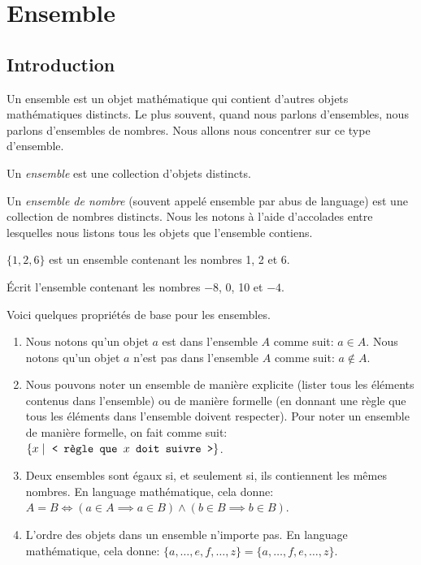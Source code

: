 \chapter{Ensemble}

\section{Introduction}

Un ensemble est un objet mathématique qui contient d'autres objets mathématiques distincts. Le plus souvent, quand nous parlons d'ensembles, nous parlons d'ensembles de nombres. Nous allons nous concentrer sur ce type d'ensemble.

\begin{definition}
    Un \emph{ensemble} est une collection d'objets distincts.
\end{definition}

\begin{definition}
    Un \emph{ensemble de nombre} (souvent appelé ensemble par abus de language) est une collection de nombres distincts. Nous les notons à l'aide d'accolades entre lesquelles nous listons tous les objets que l'ensemble contiens.
\end{definition}

\begin{exemple}
    $\{1, 2, 6\}$ est un ensemble contenant les nombres 1, 2 et 6.
\end{exemple}

\begin{exercice}
    Écrit l'ensemble contenant les nombres $-8$, 0, 10 et $-4$.
\end{exercice}

\begin{propriete}
    Voici quelques propriétés de base pour les ensembles.
    \begin{enumerate}
        \item Nous notons qu'un objet $a$ est dans l'ensemble $A$ comme suit: $a\in A$. Nous notons qu'un objet $a$ n'est pas dans l'ensemble $A$ comme suit: $a\not\in A$.
        \item Nous pouvons noter un ensemble de manière explicite (lister tous les éléments contenus dans l'ensemble) ou de manière formelle (en donnant une règle que tous les éléments dans l'ensemble doivent respecter). Pour noter un ensemble de manière formelle, on fait comme suit: $\{x \mid~\text{\ttfamily <~règle que $x$ doit suivre~>}\}$.
        \item Deux ensembles sont égaux si, et seulement si, ils contiennent les mêmes nombres. En language mathématique, cela donne: $A = B \iff (a\in A \implies a\in B) \wedge (b\in B \implies b\in B)$.
        \item L'ordre des objets dans un ensemble n'importe pas. En language mathématique, cela donne: $\{a, \dots, e, f, \dots, z\} = \{a, \dots, f, e, \dots, z\}$.
    \end{enumerate}
\end{propriete}

